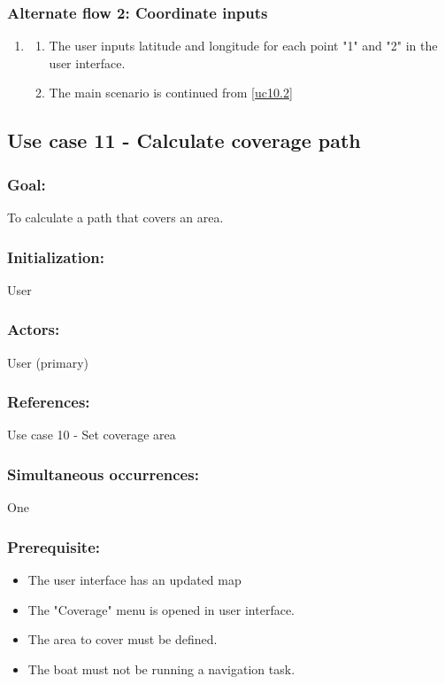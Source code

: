 \begin{framed}
	\subsubsection*{Alternate flow 2: Coordinate inputs}
	\begin{enumerate}
		\item 
		\begin{enumerate}
			\item The user inputs latitude and longitude for each point "1" and "2" in the user interface.
			\item The main scenario is continued from \ref{uc10.2}
		\end{enumerate}
	\end{enumerate}
\end{framed}	

\begin{framed}
	\subsection{Use case 11 - Calculate coverage path}
	\subsubsection*{Goal:}
	To calculate a path that covers an area.
	
	\subsubsection*{Initialization:}
	User
	
	\subsubsection*{Actors:}
	User (primary)
	
	\subsubsection*{References:}
	Use case 10 - Set coverage area
	
	\subsubsection*{Simultaneous occurrences:}
	One 
	
	\subsubsection*{Prerequisite:}
	\begin{itemize}
		\item The user interface has an updated map
		\item The "Coverage" menu is opened in user interface.
		\item The area to cover must be defined.
		\item The boat must not be running a navigation task.
	\end{itemize}
	

\end{framed}
